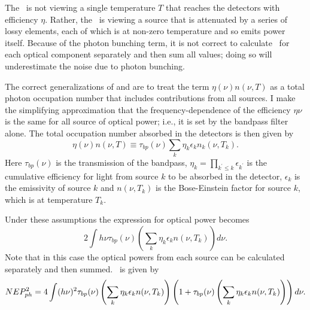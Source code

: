 % 

The \Imager\ is not viewing a single temperature $T$ that reaches the detectors with efficiency $\eta$.
Rather, the \Imager\ is viewing a  source that is attenuated by a series of lossy elements, each of which is at non-zero temperature and so emits power itself.
Because of the photon bunching term, it is not correct to calculate \NEPph\ for each optical component separately and then sum all values; doing so will underestimate the noise due to photon bunching.

The correct generalizations of  and  are to treat the term $\eta(\nu) n(\nu,T)$ as a total photon occupation number that includes contributions from all sources.
I make the simplifying approximation that the frequency-dependence of the efficiency $\eta{\nu}$ is the same for all source of optical power; i.e., it is set by the bandpass filter alone.
The total occupation number absorbed in the detectors is then given by
\begin{equation} \label{eqn:ch4-tot-n0}
  \eta(\nu) n(\nu,T) \equiv \tau_{bp}(\nu) \sum_k \eta_k \epsilon_k n_k(\nu,T_k).
\end{equation}
Here $\tau_{bp}(\nu)$ is the transmission of the bandpass, $\eta_k = \prod_{k^{\prime} \le k} \epsilon_{k^{\prime}}$ is the cumulative efficiency for light from source $k$ to be absorbed in the detector, $\epsilon_k$ is the emissivity of source $k$ and $n(\nu,T_k)$ is the Bose-Einstein factor  for source $k$, which is at temperature $T_k$.

Under these assumptions the expression for optical power becomes
\begin{equation} \label{eqn:ch4-opt-pow-all}
  2 \int h \nu \tau_{bp}(\nu) \left( \sum_k \eta_k \epsilon_k n(\nu,T_k) \right) d \nu.
\end{equation}
Note that in this case the optical powers from each source can be calculated separately and then summed.
\NEPph\ is given by
\begin{equation} \label{eqn:ch4-nep-all}
  NEP_{ph}^2 = 4 \int (h \nu)^2 \tau_{bp}(\nu) \left( \sum_k \eta_k \epsilon_k n(\nu,T_k) \right) 
       \left( 1 + \tau_{bp}(\nu) \left( \sum_k \eta_k \epsilon_k n(\nu,T_k) \right)  \right) d \nu.
\end{equation}

